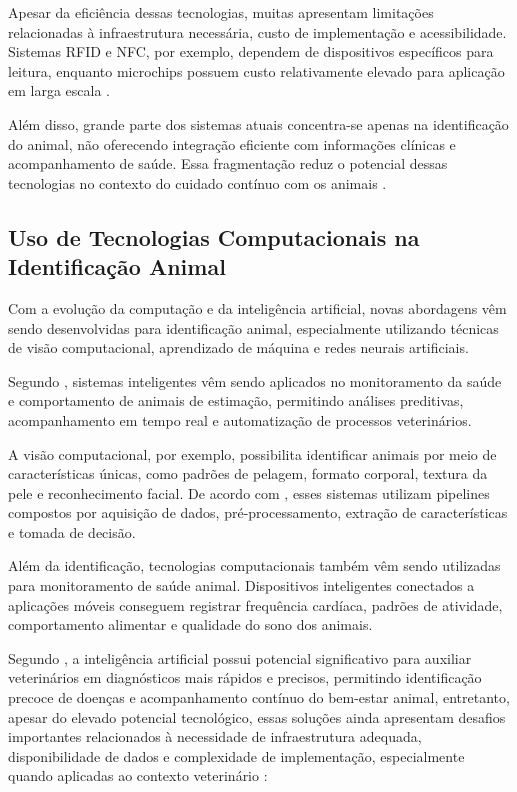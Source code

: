 \documentclass{UNESC}
\begin{document}
Apesar da eficiência dessas tecnologias, muitas apresentam limitações relacionadas à infraestrutura necessária, custo de implementação e acessibilidade. Sistemas RFID e NFC, por exemplo, dependem de dispositivos específicos para leitura, enquanto microchips possuem custo relativamente elevado para aplicação em larga escala \cite{zhao2020,sartori2018}.

Além disso, grande parte dos sistemas atuais concentra-se apenas na identificação do animal, não oferecendo integração eficiente com informações clínicas e acompanhamento de saúde. Essa fragmentação reduz o potencial dessas tecnologias no contexto do cuidado contínuo com os animais \cite{iskandar2023,MORAES2024}.

\subsection{Uso de Tecnologias Computacionais na Identificação Animal}

Com a evolução da computação e da inteligência artificial, novas abordagens vêm sendo desenvolvidas para identificação animal, especialmente utilizando técnicas de visão computacional, aprendizado de máquina e redes neurais artificiais.

Segundo , sistemas inteligentes vêm sendo aplicados no monitoramento da saúde e comportamento de animais de estimação, permitindo análises preditivas, acompanhamento em tempo real e automatização de processos veterinários.

A visão computacional, por exemplo, possibilita identificar animais por meio de características únicas, como padrões de pelagem, formato corporal, textura da pele e reconhecimento facial. De acordo com , esses sistemas utilizam pipelines compostos por aquisição de dados, pré-processamento, extração de características e tomada de decisão.

Além da identificação, tecnologias computacionais também vêm sendo utilizadas para monitoramento de saúde animal. Dispositivos inteligentes conectados a aplicações móveis conseguem registrar frequência cardíaca, padrões de atividade, comportamento alimentar e qualidade do sono dos animais.

Segundo , a inteligência artificial possui potencial significativo para auxiliar veterinários em diagnósticos mais rápidos e precisos, permitindo identificação precoce de doenças e acompanhamento contínuo do bem-estar animal, entretanto, apesar do elevado potencial tecnológico, essas soluções ainda apresentam desafios importantes relacionados à necessidade de infraestrutura adequada, disponibilidade de dados e complexidade de implementação, especialmente quando aplicadas ao contexto veterinário \cite{arshad2025,MORAES2024}:
\end{document}
